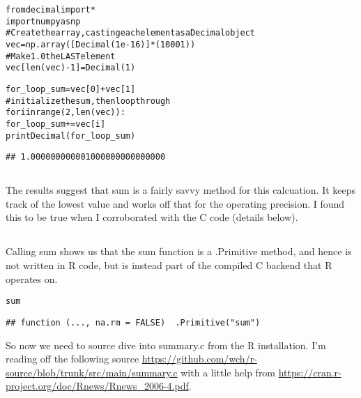 \documentclass{article}\usepackage[]{graphicx}\usepackage[]{color}
\makeatletter
\newcommand{\hlstd}[1]{\textcolor[rgb]{0.345,0.345,0.345}{#1}}%
\newenvironment{kframe}{%
 \def\at@end@of@kframe{}%
 \ifinner\ifhmode%
  \def\at@end@of@kframe{\end{minipage}}%
  \begin{minipage}{\columnwidth}%
 \fi\fi%
 \def\FrameCommand##1{\hskip\@totalleftmargin \hskip-\fboxsep
 \colorbox{shadecolor}{##1}\hskip-\fboxsep
     \hskip-\linewidth \hskip-\@totalleftmargin \hskip\columnwidth}%
 \MakeFramed {\advance\hsize-\width
   \@totalleftmargin\z@ \linewidth\hsize
   \@setminipage}}%
 {\par\unskip\endMakeFramed%
 \at@end@of@kframe}
\newenvironment{knitrout}{}{} %
\makeatother
\begin{document}
\begin{knitrout}
\color{fgcolor}\begin{kframe}
\begin{alltt}
from decimal import *
import numpy as np
# Create the array, casting each element as a Decimal object
vec = np.array([Decimal(1e-16)]*(10001))
# Make 1.0 the LAST element
vec[len(vec)-1] = Decimal(1)

for_loop_sum = vec[0] + vec[1]
# initialize the sum, then loop through
for i in range(2,len(vec)):
    for_loop_sum += vec[i]
print Decimal(for_loop_sum)
\end{alltt}

\begin{verbatim}
## 1.000000000001000000000000000
\end{verbatim}
\end{kframe}
\end{knitrout}

\subsection{}

The results suggest that sum is a fairly savvy method for this calcuation.  It keeps track of the lowest value and works off that for the operating precision.  I found this to be true when I corroborated with the C code (details below).

\subsection{}

Calling sum shows us that the sum function is a .Primitive method, and hence is not written in R code, but is instead part of the compiled C backend that R operates on.

\begin{knitrout}
\color{fgcolor}\begin{kframe}
\begin{alltt}
\hlstd{sum}
\end{alltt}
\begin{verbatim}
## function (..., na.rm = FALSE)  .Primitive("sum")
\end{verbatim}
\end{kframe}
\end{knitrout}

So now we need to source dive into summary.c from the R installation.  I'm reading off the following source \url{https://github.com/wch/r-source/blob/trunk/src/main/summary.c} with a little help from \url{https://cran.r-project.org/doc/Rnews/Rnews_2006-4.pdf}.\\\\
\end{document}
